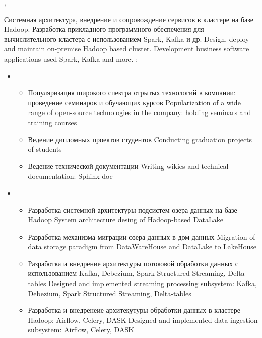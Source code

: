 \documentclass[11pt,a4paper,sans, russian]{moderncv}        %
\begin{document}
{\protect{}}
{\cityspb, \country}
{}
{
	{Системная архитектура, внедрение и сопровождение сервисов в кластере на базе Hadoop. Разработка прикладного программного обеспечения для вычислительного кластера с использованием Spark, Kafka и др.}
	{Design, deploy and maintain on-premise Hadoop based cluster. Development business software
	applications used Spark, Kafka and more.}
	\newline{}
	\achievements:
	\begin{itemize}
		\item {}
		\begin{itemize}
			\item {}
				{Популяризация широкого спектра отрытых технологий в компании: проведение семинаров и обучающих курсов}
				{Popularization of a wide range of open-source technologies in the company: holding seminars and training courses }
			\item {}
				{Ведение дипломных проектов студентов}
				{Conducting graduation projects of students}
			\item {}
				{Ведение технической документации}
				{Writing wikies and technical documentation: Sphinx-doc}
		\end{itemize}
		\item {}
		\begin{itemize}
			\item {}
				{Разработка системной архитектуры подсистем озера данных на базе Hadoop}
				{System architecture desing of Hadoop-based DataLake}
			\item {}
				{Разработка механизма миграции озера данных в дом данных}
				{Migration of data storage paradigm from DataWareHouse and DataLake to LakeHouse}
			\item {}
				{Разработка и внедрение архитектуры потоковой обработки данных с использованием Kafka, Debezium, Spark Structured Streaming, Delta-tables}
				{Designed and implemented streaming processing subsystem: Kafka, Debezium, Spark Structured Streaming, Delta-tables}
			\item {}
				{Разработка и внедренеие архитекутуры обработки данных в кластере Hadoop: Airflow, Celery, DASK}
				{Designed and implemented data ingestion subsystem: Airflow, Celery, DASK}

\end{itemize}
\end{itemize}}
\end{document}
